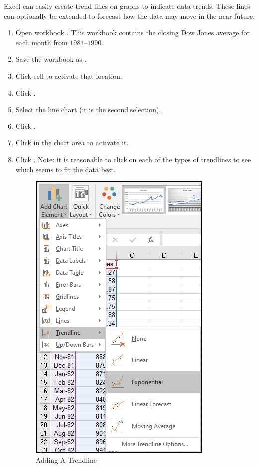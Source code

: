 Excel can easily create trend lines on graphs to indicate data trends. These lines can optionally be extended to forecast how the data may move in the near future.

\begin{enumerate}
	\item Open workbook . This workbook contains the closing Dow Jones average for each month from $ 1981 $–$ 1990 $.
	\item Save the workbook as .
	\item Click cell  to activate that location.
	\item Click .
	\item Select the line chart (it is the second selection).
	\item Click .
	\item Click in the chart area to activate it.
	\item Click . Note: it is reasonable to click on each of the types of trendlines to see which seems to fit the data best.

	\begin{figure}[H]
		\centering
		\includegraphics[width=\maxwidth{.50\linewidth}]{gfx/ch08_fig07}
		\caption{Adding A Trendline}
		\label{08:fig07}
	\end{figure}


\end{enumerate}
